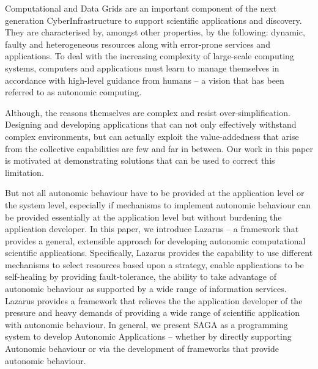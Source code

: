 \documentclass{sig-alternate}
\begin{document}
Computational and Data Grids are an important component of the next
generation CyberInfrastructure to support scientific applications and
discovery.  They are characterised by, amongst other properties, by
the following: dynamic, faulty and heterogeneous resources along with
error-prone services and applications.  To deal with the increasing
complexity of large-scale computing systems, computers and
applications must learn to manage themselves in accordance with
high-level guidance from humans -- a vision that has been referred to
as autonomic computing.

Although, the reasons themselves are complex and resist
over-simplification.  Designing and developing applications that can
not only effectively withstand complex environments, but can actually
exploit the value-addedness that arise from the collective
capabilities are few and far in between.  Our work in this paper is
motivated at demonstrating solutions that can be used to correct this
limitation.

But not all autonomic behaviour have to be provided at the application
level or the system level, especially if mechanisms to implement
autonomic behaviour can be provided essentially at the application
level but without burdening the application developer.  In this paper,
we introduce Lazarus -- a framework that provides a general,
extensible approach for developing autonomic computational scientific
applications. Specifically, Lazarus provides the capability to use
different mechanisms to select resources based upon a strategy, enable
applications to be self-healing by providing fault-tolerance, the
ability to take advantage of autonomic behaviour as supported by a
wide range of information services. Lazarus provides a framework that
relieves the the application developer of the pressure and heavy
demands of providing a wide range of scientific application with
autonomic behaviour.  In general, we present SAGA as a programming
system to develop Autonomic Applications -- whether by directly
supporting Autonomic behaviour or via the development of frameworks
that provide autonomic behaviour.



\end{document}
